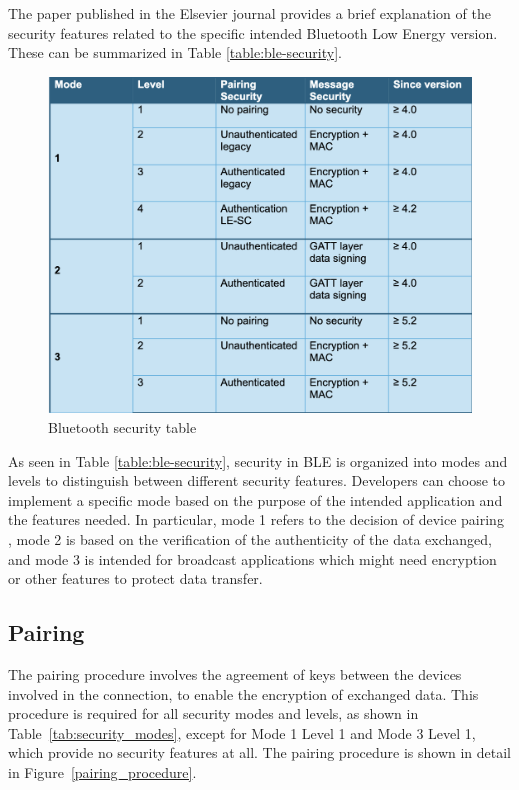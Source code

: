 \documentclass{Configuration_Files/PoliMi3i_thesis}
\begin{document}
The paper published in the Elsevier journal \cite{caesar2022survey} provides a brief explanation of the security features related to the specific intended Bluetooth Low Energy version. These can be summarized in Table \ref{table:ble-security}.

\begin{figure}[H]
    \centering
    \includegraphics[scale=0.7]{Bluetooth_Security/1.png}
    \caption{Bluetooth security table}
    \label{bluetooth_sec_1}
\end{figure}

As seen in Table \ref{table:ble-security}, security in BLE is organized into modes and levels to distinguish between different security features. Developers can choose to implement a specific mode based on the purpose of the intended application and the features needed. In particular, mode 1 refers to the decision of device pairing \cite{circuits2021}, mode 2 is based on the verification of the authenticity of the data exchanged, and mode 3 is intended for broadcast applications which might need encryption or other features to protect data transfer.

\subsection{Pairing}

The pairing procedure involves the agreement of keys between the devices involved in the connection, to enable the encryption of exchanged data. This procedure is required for all security modes and levels, as shown in Table~\ref{tab:security_modes}, except for Mode 1 Level 1 and Mode 3 Level 1, which provide no security features at all. The pairing procedure is shown in detail in Figure~\ref{pairing_procedure}.
\end{document}
